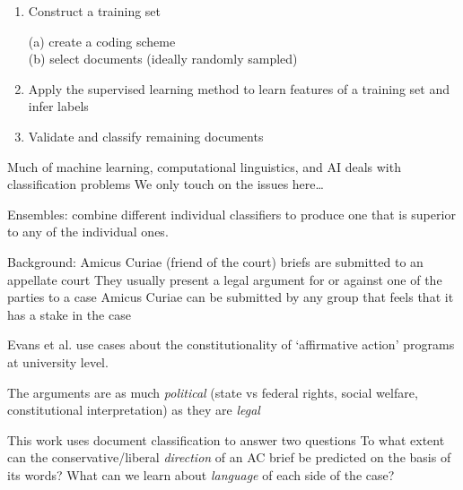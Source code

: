 \documentclass[kp]{foilpack}
\begin{document}

\begin{enumerate}

\item Construct a training set
 
(a) create a coding scheme\\
(b) select documents (ideally randomly sampled)

\item Apply the supervised learning method to learn features of a training set and infer labels

\item Validate and classify remaining documents

\end{enumerate}


Much of machine learning, computational linguistics, and AI deals with classification problems
\ita
\itm We only touch on the issues here\ldots
\itz 

Ensembles: combine different individual classifiers to produce one that is superior to any of the individual ones.



Background:
\ita
\itm Amicus Curiae (friend of the court) briefs are submitted to an appellate court
\itm They usually present a legal argument for or against one of the parties to a case
\itm Amicus Curiae can be submitted by any group that feels that it has a stake in the case
\itz


Evans et al. use cases about the constitutionality of `affirmative action' programs at university level.

The arguments are as much \textsl{political} (state vs federal rights, social welfare, constitutional interpretation) as they are \textsl{legal} 


This work uses document classification to answer two questions
\ita
\itm To what extent can the conservative/liberal \textsl{direction} of an AC brief be predicted on the basis of its words?
\itm What can we learn about \textsl{language} of each side of the case? 
\itz
\end{document}
